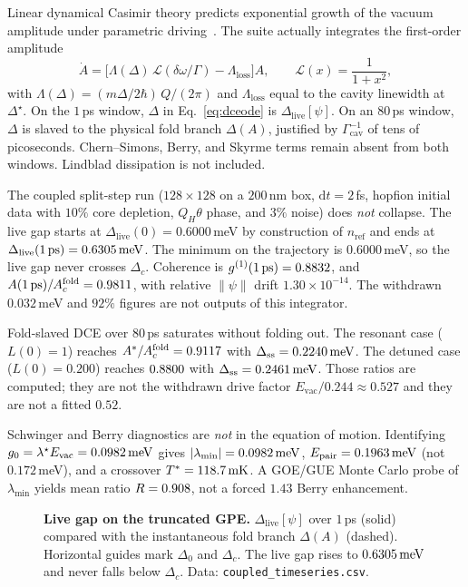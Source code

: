 \documentclass[11pt,letterpaper]{article}
\begin{document}
Linear dynamical Casimir theory predicts exponential growth of the vacuum amplitude under parametric driving~\cite{Uhlmann2004}. The suite actually integrates the first-order amplitude
\begin{equation}
\dot A=\bigl[\Lambda(\Delta)\,\mathcal{L}(\delta\omega/\Gamma)-\Lambda_{\mathrm{loss}}\bigr]A,\qquad
\mathcal{L}(x)=\frac{1}{1+x^2},
\label{eq:dceode}
\end{equation}
with $\Lambda(\Delta)=(m\Delta/2\hbar)\,Q/(2\pi)$ and $\Lambda_{\mathrm{loss}}$ equal to the cavity linewidth at $\Delta^\star$. On the $1$\,ps window, $\Delta$ in Eq.~\eqref{eq:dceode} is $\Delta_{\mathrm{live}}[\psi]$. On an $80$\,ps window, $\Delta$ is slaved to the physical fold branch $\Delta(A)$, justified by $\Gamma_{\mathrm{cav}}^{-1}$ of tens of picoseconds. Chern--Simons, Berry, and Skyrme terms remain absent from both windows. Lindblad dissipation is not included.

The coupled split-step run ($128\times 128$ on a $200$\,nm box, $\mathrm{d}t=2$\,fs, hopfion initial data with $10\%$ core depletion, $Q_H\theta$ phase, and $3\%$ noise) does \emph{not} collapse. The live gap starts at $\Delta_{\mathrm{live}}(0)=0.6000$\,meV by construction of $n_{\mathrm{ref}}$ and ends at $\Delta_{\mathrm{live}}(1\,\mathrm{ps})=0.6305\,\mathrm{meV}$. The minimum on the trajectory is $0.6000$\,meV, so the live gap never crosses $\Delta_c$. Coherence is $g^{(1)}(1\,\mathrm{ps})=0.8832$, and $A(1\,\mathrm{ps})/A_c^{\mathrm{fold}}=0.9811$, with relative $\|\psi\|$ drift $1.30\times 10^{-14}$. The withdrawn $0.032$\,meV and $92\%$ figures are not outputs of this integrator.

Fold-slaved DCE over $80$\,ps saturates without folding out. The resonant case ($L(0)=1$) reaches $A^*/A_c^{\mathrm{fold}}=0.9117$ with $\Delta_{\mathrm{ss}}=0.2240\,\mathrm{meV}$. The detuned case ($L(0)=0.200$) reaches $0.8800$ with $\Delta_{\mathrm{ss}}=0.2461\,\mathrm{meV}$. Those ratios are computed; they are not the withdrawn drive factor $E_{\mathrm{vac}}/0.244\approx 0.527$ and they are not a fitted $0.52$.

Schwinger and Berry diagnostics are \emph{not} in the equation of motion. Identifying $g_0=\lambda^\star E_{\mathrm{vac}}=0.0982\,\mathrm{meV}$ gives $|\lambda_{\min}|=0.0982\,\mathrm{meV}$, $E_{\mathrm{pair}}=0.1963\,\mathrm{meV}$ (not $0.172$\,meV), and a crossover $T^*=118.7\,\mathrm{mK}$. A GOE/GUE Monte Carlo probe of $\lambda_{\min}$ yields mean ratio $R=0.908$, not a forced $1.43$ Berry enhancement.

\begin{figure}[H]
\centering

\caption{\textbf{Live gap on the truncated GPE.} $\Delta_{\mathrm{live}}[\psi]$ over $1$\,ps (solid) compared with the instantaneous fold branch $\Delta(A)$ (dashed). Horizontal guides mark $\Delta_0$ and $\Delta_c$. The live gap rises to $0.6305\,\mathrm{meV}$ and never falls below $\Delta_c$. Data: \texttt{coupled\_timeseries.csv}.}
\label{fig:live}
\end{figure}
\end{document}

